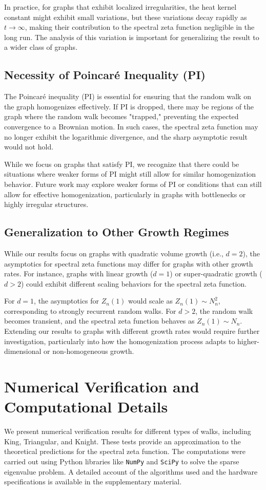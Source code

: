 \documentclass[12pt]{amsart}
\theoremstyle{definition}
\theoremstyle{remark}
\begin{document}
In practice, for graphs that exhibit localized irregularities, the heat kernel constant might exhibit small variations, but these variations decay rapidly as $ t \to \infty $, making their contribution to the spectral zeta function negligible in the long run. The analysis of this variation is important for generalizing the result to a wider class of graphs.

\subsection{Necessity of Poincaré Inequality (PI)}
The Poincaré inequality (PI) is essential for ensuring that the random walk on the graph homogenizes effectively. If PI is dropped, there may be regions of the graph where the random walk becomes "trapped," preventing the expected convergence to a Brownian motion. In such cases, the spectral zeta function may no longer exhibit the logarithmic divergence, and the sharp asymptotic result would not hold.

While we focus on graphs that satisfy PI, we recognize that there could be situations where weaker forms of PI might still allow for similar homogenization behavior. Future work may explore weaker forms of PI or conditions that can still allow for effective homogenization, particularly in graphs with bottlenecks or highly irregular structures.

\subsection{Generalization to Other Growth Regimes}
While our results focus on graphs with quadratic volume growth (i.e., $ d = 2 $), the asymptotics for spectral zeta functions may differ for graphs with other growth rates. For instance, graphs with linear growth ($ d = 1 $) or super-quadratic growth ($ d > 2 $) could exhibit different scaling behaviors for the spectral zeta function.

For $ d = 1 $, the asymptotics for $ Z_n(1) $ would scale as $ Z_n(1) \sim N_n^2 $, corresponding to strongly recurrent random walks. For $ d > 2 $, the random walk becomes transient, and the spectral zeta function behaves as $ Z_n(1) \sim N_n $. Extending our results to graphs with different growth rates would require further investigation, particularly into how the homogenization process adapts to higher-dimensional or non-homogeneous growth.

\section{Numerical Verification and Computational Details}
We present numerical verification results for different types of walks, including King, Triangular, and Knight. These tests provide an approximation to the theoretical predictions for the spectral zeta function. The computations were carried out using Python libraries like \texttt{NumPy} and \texttt{SciPy} to solve the sparse eigenvalue problem. A detailed account of the algorithms used and the hardware specifications is available in the supplementary material.
\end{document}
